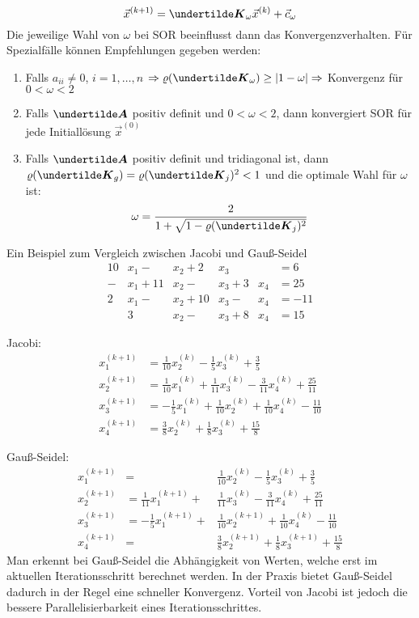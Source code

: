 \begin{enumerate}
\[\vec{x}^{(k + 1)} = \ma{K}_\omega \vec{x}^{(k)} + \vec{c}_\omega\]
Die jeweilige Wahl von $\omega$ bei SOR beeinflusst dann das Konvergenzverhalten. Für Spezialfälle können Empfehlungen gegeben werden:
\begin{enumerate}
\item Falls $a_{ii} \ne 0$, $i = 1, \dots, n$ $\Rightarrow \varrho(\ma{K}_\omega) \ge |1 - \omega| \Rightarrow$ Konvergenz für $0 < \omega < 2$
\item Falls $\ma{A}$ positiv definit und $0 < \omega < 2$, dann konvergiert SOR für jede Initiallösung $\vec{x}^{(0)}$
\item Falls $\ma{A}$ positiv definit und tridiagonal ist, dann $\varrho(\ma{K}_g) = \varrho(\ma{K}_j)^2 < 1$ und die optimale Wahl für $\omega$ ist:
\[\omega = \frac{2}{1 + \sqrt{1 - \varrho(\ma{K}_j)^2}}\]
\end{enumerate}
\end{enumerate}
Ein Beispiel zum Vergleich zwischen Jacobi und Gauß-Seidel
\begin{align*}
10 &x_1 - &x_2 + 2 &x_3 & &= 6 \\
- &x_1 + 11 &x_2 - &x_3 + 3 &x_4 &= 25 \\
2 &x_1 - &x_2 + 10 &x_3 - &x_4 &= -11 \\
& 3 &x_2 - &x_3 + 8 &x_4 &= 15
\end{align*}

Jacobi:
\begin{align*}
x_1^{(k + 1)} &= \frac{1}{10} x_2^{(k)} - \frac{1}{5} x_3^{(k)} + \frac{3}{5} \\
x_2^{(k + 1)} &= \frac{1}{10} x_1^{(k)} + \frac{1}{11} x_3^{(k)} - \frac{3}{11} x_4^{(k)} + \frac{25}{11} \\
x_3^{(k + 1)} &=  -\frac{1}{5} x_1^{(k)} + \frac{1}{10} x_2^{(k)} + \frac{1}{10} x_4^{(k)} - \frac{11}{10} \\
x_4^{(k + 1)} &= \frac{3}{8} x_2^{(k)} + \frac{1}{8} x_3^{(k)} + \frac{15}{8}
\end{align*}

Gauß-Seidel:
\begin{align*}
x_1^{(k + 1)} &= & \frac{1}{10} x_2^{(k)} - \frac{1}{5} x_3^{(k)} + \frac{3}{5} \\
x_2^{(k + 1)} &= \frac{1}{11} x_1^{(k + 1)} + & \frac{1}{11} x_3^{(k)} - \frac{3}{11} x_4^{(k)} + \frac{25}{11} \\
x_3^{(k + 1)} &= -\frac{1}{5} x_1^{(k + 1)} + & \frac{1}{10} x_2^{(k + 1)} + \frac{1}{10} x_4^{(k)} - \frac{11}{10} \\
x_4^{(k + 1)} &= & \frac{3}{8} x_2^{(k + 1)} + \frac{1}{8} x_3^{(k + 1)} + \frac{15}{8}
\end{align*}
Man erkennt bei Gauß-Seidel die Abhängigkeit von Werten, welche erst im aktuellen Iterationsschritt berechnet werden. In der Praxis bietet Gauß-Seidel dadurch in der Regel eine schneller Konvergenz. Vorteil von Jacobi ist jedoch die bessere Parallelisierbarkeit eines Iterationsschrittes.

